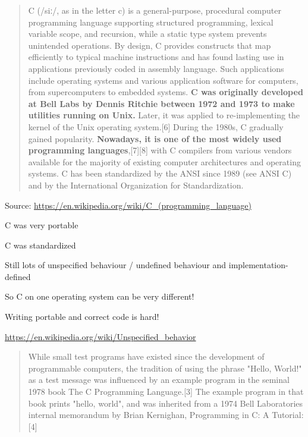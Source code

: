 \documentclass[Screen16to9,17pt]{foils}
\begin{document}
\begin{quote}
C (/siː/, as in the letter c) is a general-purpose, procedural computer programming language supporting structured programming, lexical variable scope, and recursion, while a static type system prevents unintended operations. By design, C provides constructs that map efficiently to typical machine instructions and has found lasting use in applications previously coded in assembly language. Such applications include operating systems and various application software for computers, from supercomputers to embedded systems.
{\bf
C was originally developed at Bell Labs by Dennis Ritchie between 1972 and 1973 to make utilities running on Unix.} Later, it was applied to re-implementing the kernel of the Unix operating system.[6] During the 1980s, C gradually gained popularity. {\bf Nowadays, it is one of the most widely used programming languages},[7][8] with C compilers from various vendors available for the majority of existing computer architectures and operating systems. C has been standardized by the ANSI since 1989 (see ANSI C) and by the International Organization for Standardization.
\end{quote}

Source:
\url{https://en.wikipedia.org/wiki/C_(programming_language)}



\begin{list2}
\item C was very portable
\item C was standardized
\item Still lots of unspecified behaviour / undefined behaviour and implementation-defined
\item So C on one operating system can be very different!
\item Writing portable and correct code is hard!
\end{list2}

\url{https://en.wikipedia.org/wiki/Unspecified_behavior}





\begin{quote}
While small test programs have existed since the development of programmable computers, the tradition of using the phrase "Hello, World!" as a test message was influenced by an example program in the seminal 1978 book The C Programming Language.[3] The example program in that book prints "hello, world", and was inherited from a 1974 Bell Laboratories internal memorandum by Brian Kernighan, Programming in C: A Tutorial:[4]
\end{quote}
\end{document}
